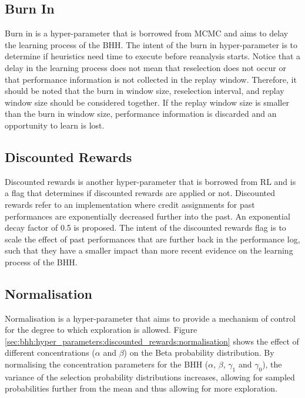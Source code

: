 \subsection{Burn In}\label{sec:bhh:hyper_parameters:burn_in}

Burn in is a hyper-parameter that is borrowed from \acf{MCMC} and aims to delay the learning process of the \acs{BHH}. The intent of the burn in hyper-parameter is to determine if heuristics need time to execute before reanalysis starts. Notice that a delay in the learning process does not mean that reselection does not occur or that performance information is not collected in the replay window. Therefore, it should be noted that the burn in window size, reselection interval, and replay window size should be considered together. If the replay window size is smaller than the burn in window size, performance information is discarded and an opportunity to learn is lost.

\subsection{Discounted Rewards}\label{sec:bhh:hyper_parameters:discounted_rewards}

Discounted rewards is another hyper-parameter that is borrowed from \acs{RL} and is a flag that determines if discounted rewards are applied or not. Discounted rewards refer to an implementation where credit assignments for past performances are exponentially decreased further into the past. An exponential decay factor of 0.5 is proposed. The intent of the discounted rewards flag is to scale the effect of past performances that are further back in the performance log, such that they have a smaller impact than more recent evidence on the learning process of the \acs{BHH}.

\subsection{Normalisation}\label{sec:bhh:hyper_parameters:normalisation}

Normalisation is a hyper-parameter that aims to provide a mechanism of control for the degree to which exploration is allowed. Figure \ref{sec:bhh:hyper_parameters:discounted_rewards:normalisation} shows the effect of different concentrations ($\alpha$ and $\beta$) on the Beta probability distribution. By normalising the concentration parameters for the \acs{BHH} ($\alpha$, $\beta$, $\gamma_{1}$ and $\gamma_{0}$), the variance of the selection probability distributions increases, allowing for sampled probabilities further from the mean and thus allowing for more exploration.

